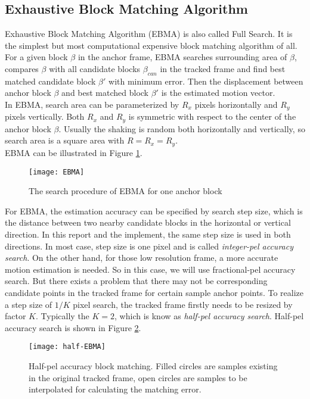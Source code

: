 \documentclass[a4paper, twocolumn]{article}
\begin{document}
	\subsection{Exhaustive Block Matching Algorithm}
	Exhaustive Block Matching Algorithm (EBMA) is also called Full Search. It is the simplest but most computational expensive block matching algorithm of all.\\
	For a given block $ \beta $ in the anchor frame, EBMA searches surrounding area of $ \beta $, compares $ \beta $ with all candidate blocks $ \beta_{can} $ in the tracked frame and find best matched candidate block $ \beta' $ with minimum error. Then the displacement between anchor block $ \beta $ and best matched block $ \beta' $ is the estimated motion vector. \\
	In EBMA, search area can be parameterized by $ R_x $ pixels horizontally and $ R_y $ pixels vertically. Both $ R_x $ and $ R_y $ is symmetric with respect to the center of the anchor block $ \beta $. Usually the shaking is random both horizontally and vertically, so search area is a square area with $ R  = R_x = R_y $. \\
	EBMA can be illustrated in Figure \ref{fig:EBMA}. \\
	\begin{figure}[h]
	\centering
	\texttt{[image: EBMA]}
	\caption[EBMA figure]{The search procedure of EBMA for one anchor block}
	\label{fig:EBMA}
	\end{figure}
	
	\noindent
	For EBMA, the estimation accuracy can be specified by search step size, which is the distance between two nearby candidate blocks in the horizontal or vertical direction. 
	In this report and the implement, the same step size is used in both directions. In most case, step size is one pixel and is called \textit{integer-pel accuracy search}. On the other hand, for those low resolution frame, a more accurate motion estimation is needed. So in this case, we will use fractional-pel accuracy search. But there exists a problem that there may not be corresponding candidate points in the tracked frame for certain sample anchor points. To realize a step size of $ 1/K $ pixel search, the tracked frame firstly needs to be resized by factor $ K $. Typically the $ K = 2 $, which is know as \textit{half-pel accuracy search}. Half-pel accuracy search is shown in Figure \ref{fig:half-EBMA}.
	\begin{figure}[h]
	\centering
	\texttt{[image: half-EBMA]}
	\caption[half EBMA]{Half-pel accuracy block matching. Filled circles are samples existing in the original tracked frame, open circles are samples to be interpolated for calculating the matching error.}
	\label{fig:half-EBMA}
	\end{figure}
	
\end{document}
